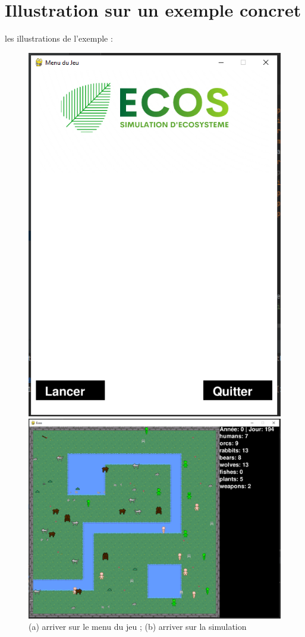 \documentclass[a4paper, 11pt]{article}
\begin{document}
\section{Illustration sur un exemple concret}
les illustrations de l'exemple :\\
\begin{figure}[ht!]
  \begin{minipage}[c]{.5\linewidth}
   \centering
   \includegraphics[width=0.75\linewidth]{images/exemple1.png}
  \end{minipage} \hfill
  \begin{minipage}[c]{.5\linewidth}
   \centering
   \includegraphics[width=1.5\linewidth]{images/exemple2.png}
  \end{minipage}
  \caption{(a) arriver sur le menu du jeu ; (b) arriver sur la simulation}
  \label{fig::example::two}
\end{figure}
\newpage
\end{document}
